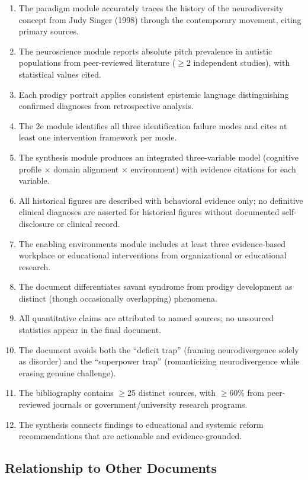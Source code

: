 \documentclass[11pt,letterpaper]{article}
\begin{document}
\begin{enumerate}[leftmargin=*, label=\textbf{SC\arabic*.}]
  \item The paradigm module accurately traces the history of the neurodiversity concept from Judy Singer (1998) through the contemporary movement, citing primary sources.
  \item The neuroscience module reports absolute pitch prevalence in autistic populations from peer-reviewed literature ($\geq$2 independent studies), with statistical values cited.
  \item Each prodigy portrait applies consistent epistemic language distinguishing confirmed diagnoses from retrospective analysis.
  \item The 2e module identifies all three identification failure modes and cites at least one intervention framework per mode.
  \item The synthesis module produces an integrated three-variable model (cognitive profile $\times$ domain alignment $\times$ environment) with evidence citations for each variable.
  \item All historical figures are described with behavioral evidence only; no definitive clinical diagnoses are asserted for historical figures without documented self-disclosure or clinical record.
  \item The enabling environments module includes at least three evidence-based workplace or educational interventions from organizational or educational research.
  \item The document differentiates savant syndrome from prodigy development as distinct (though occasionally overlapping) phenomena.
  \item All quantitative claims are attributed to named sources; no unsourced statistics appear in the final document.
  \item The document avoids both the ``deficit trap'' (framing neurodivergence solely as disorder) and the ``superpower trap'' (romanticizing neurodivergence while erasing genuine challenge).
  \item The bibliography contains $\geq$25 distinct sources, with $\geq$60\% from peer-reviewed journals or government/university research programs.
  \item The synthesis connects findings to educational and systemic reform recommendations that are actionable and evidence-grounded.
\end{enumerate}

\subsection{Relationship to Other Documents}
\end{document}
